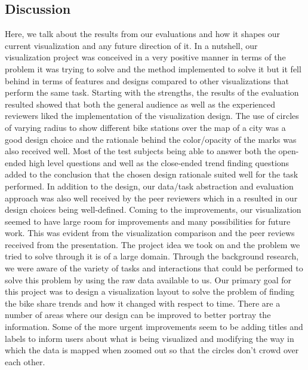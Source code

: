 \subsection{Discussion}
Here, we talk about the results from our evaluations and how it shapes our current visualization and any future direction of it. In a nutshell, our visualization project was conceived in a very positive manner in terms of the problem it was trying to solve and the method implemented to solve it but it fell behind in terms of features and designs compared to other visualizations that perform the same task.\newline
Starting with the strengths, the results of the evaluation resulted showed that both the general audience as well as the experienced reviewers liked the implementation of the visualization design. The use of circles of varying radius to show different bike stations over the map of a city was a good design choice and the rationale behind the color/opacity of the marks was also received well. Most of the test subjects being able to answer both the open-ended high level questions and well as the close-ended trend finding questions added to the conclusion that the chosen design rationale suited well for the task performed. In addition to the design, our data/task abstraction and evaluation approach was also well received by the peer reviewers which in a resulted in our design choices being well-defined.\newline
Coming to the improvements, our visualization seemed to have large room for improvements and many possibilities for future work. This was evident from the visualization comparison and the peer reviews received from the presentation. The project idea we took on and the problem we tried to solve through it is of a large domain. Through the background research, we were aware of the variety of tasks and interactions that could be performed to solve this problem by using the raw data available to us. Our primary goal for this project was to design a visualization layout to solve the problem of finding the bike share trends and how it changed with respect to time. There are a number of areas where our design can be improved to better portray the information. Some of the more urgent improvements seem to be adding titles and labels to inform users about what is being visualized and modifying the way in which the data is mapped when zoomed out so that the circles don't crowd over each other.\newline
